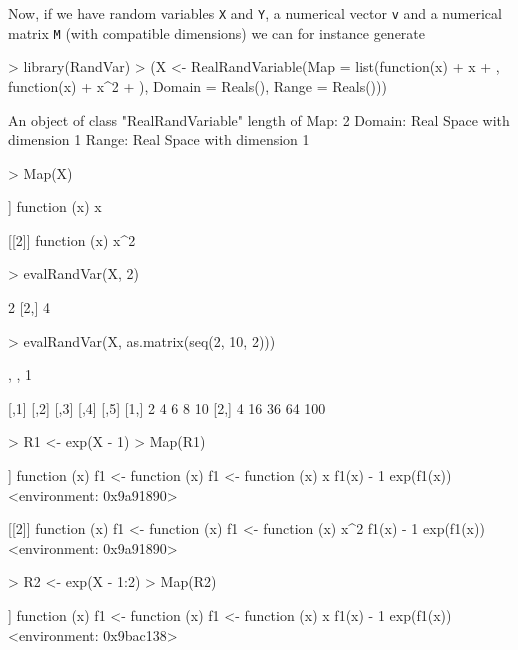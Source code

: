 \documentclass[11pt]{article}
\begin{document}
Now, if we have random variables {\tt X} and {\tt Y}, a numerical
vector {\tt v} and a numerical matrix {\tt M} (with compatible dimensions)
we can for instance generate
\begin{Schunk}
\begin{Sinput}
> library(RandVar)
> (X <- RealRandVariable(Map = list(function(x) {
+     x
+ }, function(x) {
+     x^2
+ }), Domain = Reals(), Range = Reals()))
\end{Sinput}
\begin{Soutput}
An object of class "RealRandVariable" 
length of Map:	 2 
Domain:	Real Space with dimension 1 
Range:	Real Space with dimension 1 
\end{Soutput}
\begin{Sinput}
> Map(X)
\end{Sinput}
\begin{Soutput}
[[1]]
function (x) 
{
    x
}

[[2]]
function (x) 
{
    x^2
}
\end{Soutput}
\begin{Sinput}
> evalRandVar(X, 2)
\end{Sinput}
\begin{Soutput}
     [,1]
[1,]    2
[2,]    4
\end{Soutput}
\begin{Sinput}
> evalRandVar(X, as.matrix(seq(2, 10, 2)))
\end{Sinput}
\begin{Soutput}
, , 1

     [,1] [,2] [,3] [,4] [,5]
[1,]    2    4    6    8   10
[2,]    4   16   36   64  100
\end{Soutput}
\begin{Sinput}
> R1 <- exp(X - 1)
> Map(R1)
\end{Sinput}
\begin{Soutput}
[[1]]
function (x) 
{
    f1 <- function (x) 
    {
        f1 <- function (x) 
        {
            x
        }
        f1(x) - 1
    }
    exp(f1(x))
}
<environment: 0x9a91890>

[[2]]
function (x) 
{
    f1 <- function (x) 
    {
        f1 <- function (x) 
        {
            x^2
        }
        f1(x) - 1
    }
    exp(f1(x))
}
<environment: 0x9a91890>
\end{Soutput}
\begin{Sinput}
> R2 <- exp(X - 1:2)
> Map(R2)
\end{Sinput}
\begin{Soutput}
[[1]]
function (x) 
{
    f1 <- function (x) 
    {
        f1 <- function (x) 
        {
            x
        }
        f1(x) - 1
    }
    exp(f1(x))
}
<environment: 0x9bac138>


\end{Soutput}
\end{Schunk}
\end{document}

